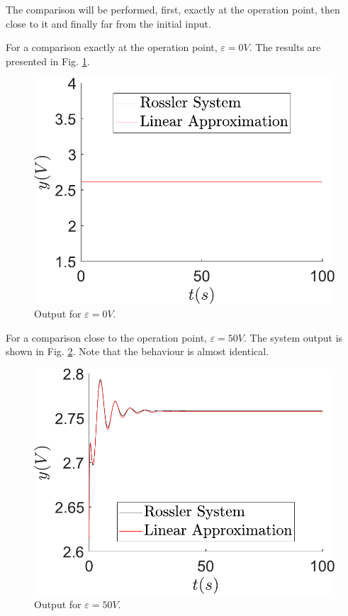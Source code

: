 The comparison will be performed, first, exactly at the operation point, then close to it and finally far from the initial input.

For a comparison exactly at the operation point, $\varepsilon=0V$. The results are presented in Fig. \ref{fig:comparDelta0}.

\begin{figure}[H]
    \centering
    \includegraphics[scale=0.5]{figs/comparLinearVSNonlinear/yvsT_InputDelta0.pdf}
    \caption{Output for $\varepsilon=0V$.}
    \label{fig:comparDelta0}
\end{figure}

For a comparison close to the operation point, $\varepsilon=50V$. The system output is shown in Fig. \ref{fig:comparDelta50}. Note that the behaviour is almost identical.

\begin{figure}[H]
    \centering
    \includegraphics[scale=0.5]{figs/comparLinearVSNonlinear/yvsT_InputDelta50.pdf}
    \caption{Output for $\varepsilon=50V$.}
    \label{fig:comparDelta50}
\end{figure}

